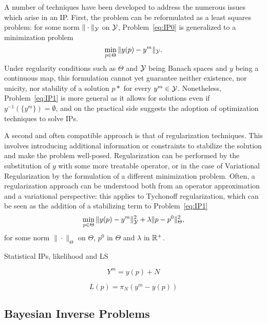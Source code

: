 A number of techniques have been developed to address the numerous issues which arise in an IP.
First, the problem can be reformulated as a least squares problem: for some norm $\| \cdot \| _\mathcal Y$ on $\mathcal Y$, Problem~\ref{eq:IP0} is generalized to a minimization problem
\begin{equation}\label{eq:IP1}
    \min_{p\in \Theta} \| y(p) - y^m \|_\mathcal Y.
\end{equation}
Under regularity conditions such as $\Theta$ and $\mathcal Y$ being Banach spaces and $y$ being a continuous map, this formulation cannot yet guarantee neither existence, nor unicity, nor stability of a solution $p*$ for every $y^m \in \mathcal Y$. Nonetheless, Problem~\ref{eq:IP1} is more general as it allows for solutions even if $y^{-1}(\{y^m\} )= \emptyset$, and on the practical side suggests the adoption of optimization techniques to solve IPs.

A second and often compatible approach is that of regularization techniques. This involves introducing additional information or constraints to stabilize the solution and make the problem well-posed. Regularization can be performed by the substitution of $y$ with some more treatable operator, or in the case of Variational Regularization by the formulation of a different minimization problem. Often, a regularization approach can be understood both from an operator approximation and a variational perspective: this applies to Tychonoff regularization, which can be seen as the addition of a stabilizing term to Problem~\ref{eq:IP1}
\begin{equation}\label{eq:Tycho}
    \min_{p\in \Theta} \| y(p) - y^m \|_\mathcal Y^2 + \lambda\| p - p^0 \|_\Theta^2,
\end{equation}
for some norm $\|\cdot\|_\Theta$ on $\Theta$, $p^0$ in $\Theta$ and $\lambda $ in $ \mathbb{R}^+$. \medskip


Statistical IPs, likelihood and LS 

\begin{equation}\label{eq:par-to-obs}
    Y^m = y(p) + N
\end{equation}

\begin{equation}\label{eq:likelihood}
    L(p) = \pi_N(y^m - y(p))
\end{equation}

\subsection{Bayesian Inverse Problems}\label{sec:BIP}

